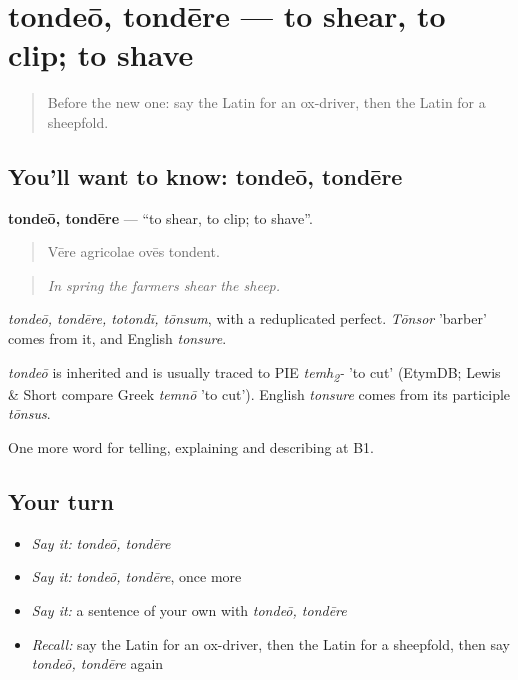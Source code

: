 \section[tondeō, tondēre]{tondeō, tondēre — to shear, to clip; to shave}

\label{lesson:LA-C478-tondeo}



\begin{quote}
Before the new one: say the Latin for an ox-driver, then the Latin for a sheepfold.
\end{quote}

\subsection*{You'll want to know: tondeō, tondēre}
\textbf{tondeō, tondēre} — \textquotedblleft{}to shear, to clip; to shave\textquotedblright{}.

\begin{quote}
Vēre agricolae ovēs tondent.
\end{quote}

\begin{quote}
\emph{In spring the farmers shear the sheep.}
\end{quote}

\emph{tondeō, tondēre, totondī, tōnsum}, with a reduplicated perfect. \emph{Tōnsor} 'barber' comes from it, and English \emph{tonsure}.

\begin{cousinweb}
\emph{tondeō} is inherited and is usually traced to PIE \emph{temh\textsubscript{2}-} 'to cut' (EtymDB; Lewis \& Short compare Greek \emph{temnō} 'to cut'). English \emph{tonsure} comes from its participle \emph{tōnsus}.
\end{cousinweb}

\begin{grammarlens}[title={What you've built}]
One more word for telling, explaining and describing at B1.
\end{grammarlens}

\subsection*{Your turn}
\begin{itemize}
\raggedright
  \item \emph{Say it:} \emph{tondeō, tondēre}
  \item \emph{Say it:} \emph{tondeō, tondēre}, once more
  \item \emph{Say it:} a sentence of your own with \emph{tondeō, tondēre}
  \item \emph{Recall:} say the Latin for an ox-driver, then the Latin for a sheepfold, then say \emph{tondeō, tondēre} again
\end{itemize}

